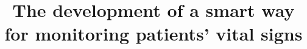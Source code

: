\documentclass{bmcart}
\begin{document}
\begin{frontmatter}

\begin{fmbox}


\title{The development of a smart way for monitoring patients' vital signs}


\author[ addressref={aff1}, email={michael187107@fci.bu.edu.eg}
]{ }

\author[ addressref={aff1}, email={samaa187070@fci.bu.edu.eg}
   ]{ }

   \author[ addressref={aff1}, email={ismail187006@fci.bu.edu.eg}
   ]{ }

\author[ addressref={aff1}, email={youssef187167@fci.bu.edu.eg}
]{ }

\author[ addressref={aff1}, email={mohamed187109@fci.bu.edu.eg}
]{ }


\address[id=aff1]{%
  , %
  ,                     %
  ,                              %
} 


\end{fmbox}
\end{frontmatter}
\end{document}
